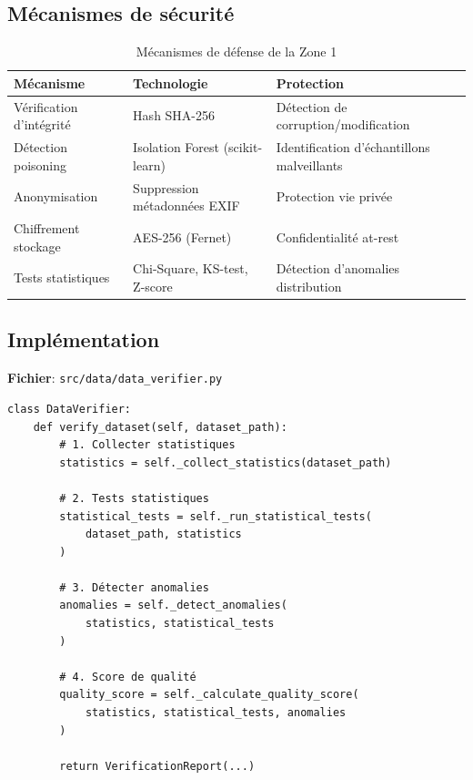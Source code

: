 \documentclass[11pt,a4paper]{article}
\begin{document}
\subsection{Mécanismes de sécurité}

\begin{table}[h!]
\centering
\caption{Mécanismes de défense de la Zone 1}
\label{tab:zone1_defenses}
\begin{tabularx}{\textwidth}{|l|X|X|}
\hline
\textbf{Mécanisme} & \textbf{Technologie} & \textbf{Protection} \\ \hline
Vérification d'intégrité & Hash SHA-256 & Détection de corruption/modification \\ \hline
Détection poisoning & Isolation Forest (scikit-learn) & Identification d'échantillons malveillants \\ \hline
Anonymisation & Suppression métadonnées EXIF & Protection vie privée \\ \hline
Chiffrement stockage & AES-256 (Fernet) & Confidentialité at-rest \\ \hline
Tests statistiques & Chi-Square, KS-test, Z-score & Détection d'anomalies distribution \\ \hline
\end{tabularx}
\end{table}

\subsection{Implémentation}

\textbf{Fichier}: \texttt{src/data/data\_verifier.py}

\begin{tcolorbox}[colback=gray!5, colframe=gray!50, title=Extrait de code - DataVerifier]
\begin{verbatim}
class DataVerifier:
    def verify_dataset(self, dataset_path):
        # 1. Collecter statistiques
        statistics = self._collect_statistics(dataset_path)

        # 2. Tests statistiques
        statistical_tests = self._run_statistical_tests(
            dataset_path, statistics
        )

        # 3. Détecter anomalies
        anomalies = self._detect_anomalies(
            statistics, statistical_tests
        )

        # 4. Score de qualité
        quality_score = self._calculate_quality_score(
            statistics, statistical_tests, anomalies
        )

        return VerificationReport(...)
\end{verbatim}
\end{tcolorbox}
\end{document}
